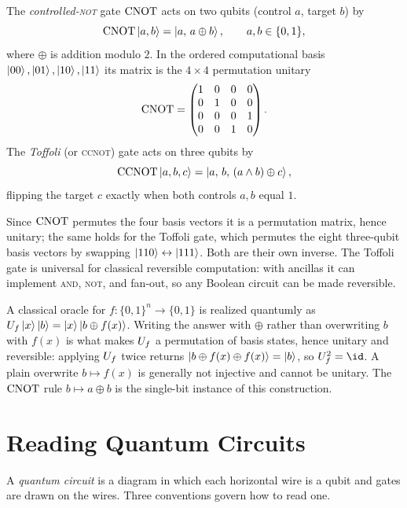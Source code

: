 \begin{definition}
The \emph{controlled-\textsc{not}} gate $\mathrm{CNOT}$ acts on two qubits (control
$a$, target $b$) by
\[
  \mathrm{CNOT}\ket{a,b}=\ket{a,\,a\oplus b},\qquad a,b\in\{0,1\},
\]
where $\oplus$ is addition modulo $2$. In the ordered computational basis
$\ket{00},\ket{01},\ket{10},\ket{11}$ its matrix is the $4\times4$ permutation
unitary
\[
  \mathrm{CNOT}=\begin{pmatrix}
    1&0&0&0\\ 0&1&0&0\\ 0&0&0&1\\ 0&0&1&0
  \end{pmatrix}.
\]
The \emph{Toffoli} (or \textsc{ccnot}) gate acts on three qubits by
\[
  \mathrm{CCNOT}\ket{a,b,c}=\ket{a,\,b,\,(a\wedge b)\oplus c},
\]
flipping the target $c$ exactly when both controls $a,b$ equal $1$.
\end{definition}

Since $\mathrm{CNOT}$ permutes the four basis vectors it is a permutation matrix, hence
unitary; the same holds for the Toffoli gate, which permutes the eight
three-qubit basis vectors by swapping $\ket{110}\leftrightarrow\ket{111}$. Both
are their own inverse. The Toffoli gate is universal for classical reversible
computation: with ancillas it can implement \textsc{and}, \textsc{not}, and
fan-out, so any Boolean circuit can be made reversible.

\begin{remark}
A classical oracle for $f:\{0,1\}^{n}\to\{0,1\}$ is realized quantumly as
$U_f\ket{x}\ket{b}=\ket{x}\ket{b\oplus f(x)}$. Writing the answer with $\oplus$
rather than overwriting $b$ with $f(x)$ is what makes $U_f$ a permutation of
basis states, hence unitary and reversible: applying $U_f$ twice returns
$\ket{b\oplus f(x)\oplus f(x)}=\ket{b}$, so $\Uf^{2}=\id$. A plain overwrite
$b\mapsto f(x)$ is generally not injective and cannot be unitary. The $\mathrm{CNOT}$
rule $b\mapsto a\oplus b$ is the single-bit instance of this construction.
\end{remark}

\section{Reading Quantum Circuits}

A \emph{quantum circuit} is a diagram in which each horizontal wire is a qubit
and gates are drawn on the wires. Three conventions govern how to read one.

